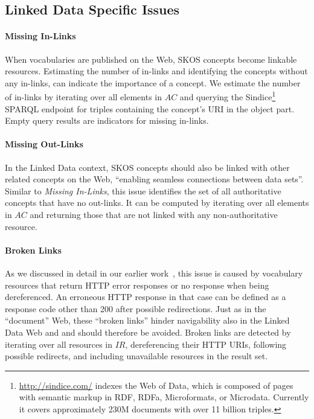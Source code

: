 {%

\subsection{Linked Data Specific Issues}\label{subsec:ld_issues}

\paragraph{Missing In-Links}

When vocabularies are published on the Web, SKOS concepts become linkable resources. Estimating the number of in-links and identifying the concepts without any in-links, can indicate the importance of a concept.
We estimate the number of in-links by iterating over all elements in $AC$ and querying the Sindice\footnote{\url{http://sindice.com/} indexes the Web of Data, which is composed of pages with semantic markup in RDF, RDFa, Microformats, or Microdata. Currently it covers approximately 230M documents with over 11 billion triples.} SPARQL endpoint for triples containing the concept's URI in the object part. Empty query results are indicators for missing in-links.

\paragraph{Missing Out-Links}

In the Linked Data context, SKOS concepts should also be linked with other related concepts on the Web, ``enabling seamless connections between data sets''\cite{Heath2011}. Similar to \emph{Missing In-Links}, this issue identifies the set of all authoritative concepts that have no out-links.
It can be computed by iterating over all elements in $AC$ and returning those that are not linked with any non-authoritative resource.

\paragraph{Broken Links}

As we discussed in detail in our earlier work~\cite{Popitsch:2010:DHB:1772690.1772768}, this issue is caused by vocabulary resources that return HTTP error responses or no response when being dereferenced. An erroneous HTTP response in that case can be defined as a response code other than 200 after possible redirections. Just as in the ``document'' Web, these ``broken links'' hinder navigability also in the Linked Data Web and and should therefore be avoided. 
Broken links are detected by iterating over all resources in $IR$, dereferencing their HTTP URIs, following possible redirects, and including unavailable resources in the result set.

}
